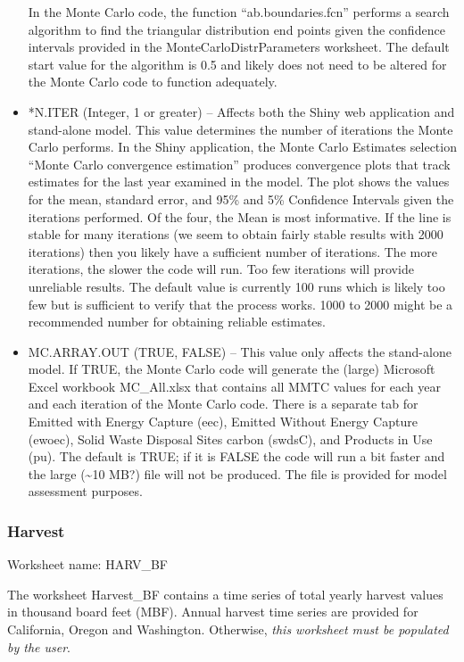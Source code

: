 \documentclass[
  openany]{book}
\begin{document}
\begin{itemize}
  In the Monte Carlo code, the function ``ab.boundaries.fcn'' performs a
  search algorithm to find the triangular distribution end points given
  the confidence intervals provided in the MonteCarloDistrParameters
  worksheet. The default start value for the algorithm is 0.5 and likely
  does not need to be altered for the Monte Carlo code to function
  adequately.
\item
  *N.ITER (Integer, 1 or greater) -- Affects both the Shiny web
  application and stand-alone model. This value determines the number of
  iterations the Monte Carlo performs. In the Shiny application, the
  Monte Carlo Estimates selection ``Monte Carlo convergence estimation''
  produces convergence plots that track estimates for the last year
  examined in the model. The plot shows the values for the mean,
  standard error, and 95\% and 5\% Confidence Intervals given the
  iterations performed. Of the four, the Mean is most informative. If
  the line is stable for many iterations (we seem to obtain fairly
  stable results with 2000 iterations) then you likely have a sufficient
  number of iterations. The more iterations, the slower the code will
  run. Too few iterations will provide unreliable results. The default
  value is currently 100 runs which is likely too few but is sufficient
  to verify that the process works. 1000 to 2000 might be a recommended
  number for obtaining reliable estimates.
\item
  MC.ARRAY.OUT (TRUE, FALSE) -- This value only affects the stand-alone
  model. If TRUE, the Monte Carlo code will generate the (large)
  Microsoft Excel workbook MC\_All.xlsx that contains all MMTC values
  for each year and each iteration of the Monte Carlo code. There is a
  separate tab for Emitted with Energy Capture (eec), Emitted Without
  Energy Capture (ewoec), Solid Waste Disposal Sites carbon (swdsC), and
  Products in Use (pu). The default is TRUE; if it is FALSE the code
  will run a bit faster and the large (\textasciitilde10 MB?) file will
  not be produced. The file is provided for model assessment purposes.
\end{itemize}

\hypertarget{own-prov-input-harvest}{%
\subsubsection{Harvest}\label{own-prov-input-harvest}}

Worksheet name: HARV\_BF

The worksheet Harvest\_BF contains a time series of total yearly harvest
values in thousand board feet (MBF). Annual harvest time series are
provided for California, Oregon and Washington. Otherwise, \emph{this
worksheet must be populated by the user}.
\end{document}

